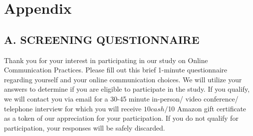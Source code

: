 \section{Appendix}
\label{sec:Appendix}
\subsection{A. SCREENING QUESTIONNAIRE}
Thank you for your interest in participating in our study on Online Communication Practices.   Please fill out this brief 1-minute questionnaire regarding yourself and your online communication choices. We will utilize your answers to determine if you are eligible to participate in the study. If you qualify, we will contact you via email for a 30-45 minute in-person/ video conference/ telephone interview for which you will receive $10 cash/$10 Amazon gift certificate as a token of our appreciation for your participation. If you do not qualify for participation, your responses will be safely discarded. 
